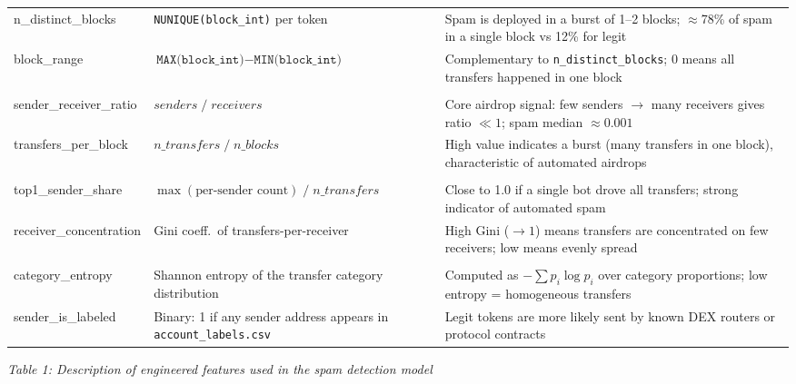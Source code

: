 \documentclass[11pt, a4paper]{article}
\begin{document}
\begin{tabular}{>{\ttfamily}p{4.6cm} >{\raggedright\arraybackslash}p{4.0cm} >{\raggedright\arraybackslash}p{5.6cm}}
n\_distinct\_blocks
  & \texttt{NUNIQUE(block\_int)} per token
  & Spam is deployed in a burst of 1--2 blocks; $\approx$78\% of spam in a single block vs 12\% for legit \\[4pt]

block\_range
  & $\texttt{MAX(block\_int)} - \texttt{MIN(block\_int)}$
  & Complementary to \texttt{n\_distinct\_blocks}; 0 means all transfers happened in one block \\[6pt]

\multicolumn{3}{l}{\textit{Ratio \& derived}} \\[2pt]

sender\_receiver\_ratio
  & $\mathit{senders} \;/\; \mathit{receivers}$
  & Core airdrop signal: few senders $\to$ many receivers gives ratio $\ll 1$; spam median $\approx 0.001$ \\[4pt]

transfers\_per\_block
  & $\mathit{n\_transfers} \;/\; \mathit{n\_blocks}$
  & High value indicates a burst (many transfers in one block), characteristic of automated airdrops \\[6pt]

\multicolumn{3}{l}{\textit{Concentration}} \\[2pt]

top1\_sender\_share
  & $\max(\text{per-sender count}) \;/\; n\_transfers$
  & Close to 1.0 if a single bot drove all transfers; strong indicator of automated spam \\[4pt]

receiver\_concentration
  & Gini coeff.\ of transfers-per-receiver
  & High Gini ($\to 1$) means transfers are concentrated on few receivers; low means evenly spread \\[6pt]

\multicolumn{3}{l}{\textit{External / categorical}} \\[2pt]

category\_entropy
  & Shannon entropy of the transfer category distribution
  & Computed as $-\sum p_i \log p_i$ over category proportions; low entropy = homogeneous transfers \\[4pt]

sender\_is\_labeled
  & Binary: 1 if any sender address appears in \texttt{account\_labels.csv}
  & Legit tokens are more likely sent by known DEX routers or protocol contracts \\

\bottomrule
\end{tabular}

\vspace{1em}
\begin{center}
\textit{Table 1: Description of engineered features used in the spam detection model}
\end{center}
\end{document}
